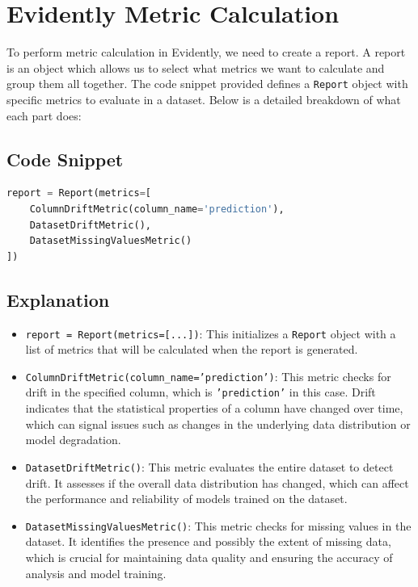\documentclass[letterpaper,12pt,notitlepage,twoside]{report}
\begin{document}
\section{Evidently Metric Calculation}
To perform metric calculation in Evidently, we need to create a report. A report is an object which allows us to select what metrics we want to calculate and group them all together. The code snippet provided defines a \texttt{Report} object with specific metrics to evaluate in a dataset. Below is a detailed breakdown of what each part does:

\subsection*{Code Snippet}
\begin{lstlisting}[language=Python]
report = Report(metrics=[
    ColumnDriftMetric(column_name='prediction'),
    DatasetDriftMetric(),
    DatasetMissingValuesMetric()
])
\end{lstlisting}

\subsection*{Explanation}
\begin{itemize}
    \item \texttt{report = Report(metrics=[...])}: This initializes a \texttt{Report} object with a list of metrics that will be calculated when the report is generated.
    
    \item \texttt{ColumnDriftMetric(column\_name='prediction')}: This metric checks for drift in the specified column, which is \texttt{'prediction'} in this case. Drift indicates that the statistical properties of a column have changed over time, which can signal issues such as changes in the underlying data distribution or model degradation.
    
    \item \texttt{DatasetDriftMetric()}: This metric evaluates the entire dataset to detect drift. It assesses if the overall data distribution has changed, which can affect the performance and reliability of models trained on the dataset.
    
    \item \texttt{DatasetMissingValuesMetric()}: This metric checks for missing values in the dataset. It identifies the presence and possibly the extent of missing data, which is crucial for maintaining data quality and ensuring the accuracy of analysis and model training.
\end{itemize}
\end{document}

